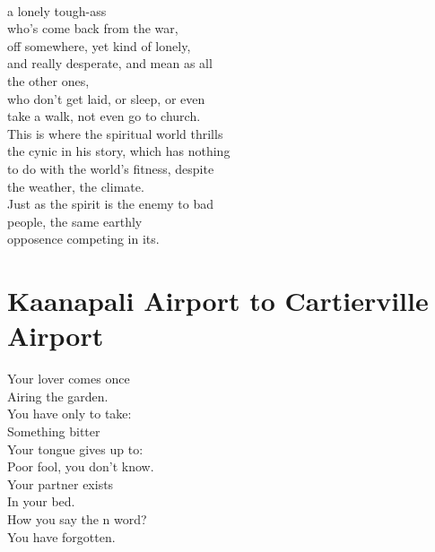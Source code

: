 \documentclass[smalldemyvopaper,11pt,twoside,onecolumn,openright,extrafontsizes]{memoir}
\begin{document}
\\a lonely tough-ass
\\who's come back from the war,
\\off somewhere, yet kind of lonely,
\\and really desperate, and mean as all
\\the other ones,
\\who don't get laid, or sleep, or even
\\take a walk, not even go to church.
\\This is where the spiritual world thrills
\\the cynic in his story, which has nothing
\\to do with the world's fitness, despite
\\the weather, the climate.
\\Just as the spirit is the enemy to bad
\\people, the same earthly
\\opposence competing in its.



\chapter{Kaanapali Airport to Cartierville Airport}
Your lover comes once
\\Airing the garden.
\\You have only to take:
\\Something bitter
\\Your tongue gives up to:
\\Poor fool, you don't know.
\\Your partner exists
\\In your bed.
\\How you say the n word?
\\You have forgotten.
\end{document}
